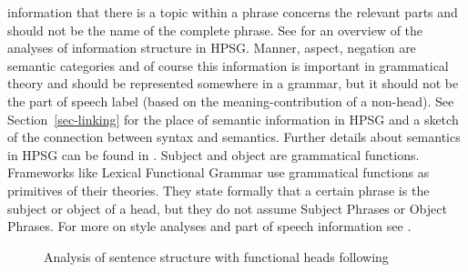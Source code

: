 information that there is a topic within a phrase concerns the relevant parts and should not be the name of the complete phrase. See
 for an overview of the analyses of information structure in HPSG. Manner,
aspect, negation are semantic categories and of course this
information is important in grammatical theory and should be represented somewhere in a grammar, but
it should not be the part of speech label (based on the meaning-contribution of a non-head). See Section~\ref{sec-linking} for the place of semantic information in
HPSG and a sketch of the connection between syntax and semantics. Further details about semantics in
HPSG can be found in .
%
Subject and object are grammatical functions. 
Frameworks like Lexical Functional Grammar use grammatical
functions as primitives of their theories. They state formally that a certain phrase is the subject or object
of a head, but they do not assume Subject Phrases or Object Phrases. For more on \citeauthor{CR2010a} style analyses and part of speech information see .
\begin{figure}
\caption{\label{Abbildung-Remnant-Movement-Satzstruktur}Analysis of sentence structure with functional heads following \citet[]{Laenzlinger2004a}}
\end{figure}%

